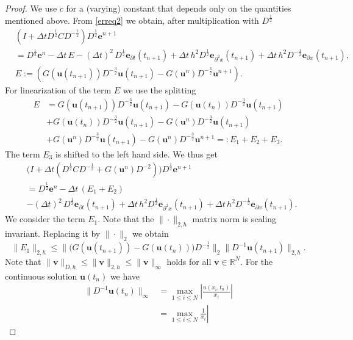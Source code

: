 \documentclass[10pt,a4paper]{amsart}
\newcommand{\R}{\mathbb{R}}
\newcommand{\be}{\mathbf e}
\newcommand{\bu}{\mathbf u}
\newcommand{\bv}{\mathbf v}
\begin{document}
\begin{proof} We use $c$ for a (varying) constant that depends only on the quantities mentioned above. 
From \eqref{erreq2} we obtain, after multiplication with $D^\frac12$
\[ \begin{split}
  & (I+\Delta t D^\frac12C D^{-\frac12})D^\frac12\be^{n+1} \\ & =D^{\frac12}\be^n - \Delta t\, E    -(\Delta t)^2 \,D^\frac12 \be_{\partial t}(t_{n+1}) +  \Delta t\,  h^2 D^\frac12\be_{\partial^2 x}(t_{n+1})+ \Delta t\, h^2 D^{-\frac12}\be_{\partial x}(t_{n+1}), \\
  & E:= \left(G(\bu(t_{n+1}))D^{-\frac32}\bu(t_{n+1})- G(\bu^n)D^{-\frac32}\bu^{n+1}\right).
\end{split} \]
For linearization of the term $E$ we use the splitting
\begin{equation} \label{splitE}
 \begin{split}
  E & = G(\bu(t_{n+1}))D^{-\frac32}\bu(t_{n+1})- G(\bu(t_n))D^{-\frac32}\bu(t_{n+1}) \\
     & + G(\bu(t_n))D^{-\frac32}\bu(t_{n+1})- G(\bu^n)D^{-\frac32}\bu(t_{n+1}) \\
     & + G(\bu^n)D^{-\frac32}\bu(t_{n+1})- G(\bu^n)D^{-\frac32}\bu^{n+1} =:E_1+E_2+E_3.
 \end{split}
\end{equation}
The term $E_3$ is shifted to the left hand side. We thus get  
\begin{equation} \label{erreq8} \begin{split}
  & \big(I+\Delta t (D^\frac12C D^{-\frac12} +G(\bu^n)D^{-2})\big)D^{\frac12}\be^{n+1} \\ & =D^{\frac12}\be^n - \Delta t\, (E_1+E_2)  \\ &   -(\Delta t)^2 \,D^\frac12 \be_{\partial t}(t_{n+1}) +  \Delta t\,  h^2 D^\frac12\be_{\partial^2 x}(t_{n+1})+ \Delta t\, h^2 D^{-\frac12}\be_{\partial x}(t_{n+1}).
\end{split} \end{equation}
We  consider the term $E_1$. Note that the $\|\cdot\|_{2,h}$ matrix norm is scaling invariant. Replacing it by $\|\cdot\|_2$ we obtain
\[
 \|E_1\|_{2,h} \leq \|\big(G(\bu(t_{n+1}))- G(\bu(t_n))\big)D^{-\frac12}\|_2 \|D^{-1}\bu(t_{n+1})\|_{2,h}.
\]
Note that $\|\bv\|_{D,h}\leq \|\bv\|_{2,h} \leq \|\bv\|_\infty$ holds for all $\bv \in \R^N$. 
For the continuous solution $\bu(t_n)$ we have
\begin{equation} \label{erreq4} \begin{split}
  \|D^{-1}\bu(t_n)\|_{\infty} & = \max_{1 \leq i \leq N} \left| \frac{u(x_i,t_n)}{x_i}\right| \\ & =\max_{1 \leq i \leq N} \frac{1}{x_i} \left|

\end{split}
\end{equation}
\end{proof}
\end{document}
